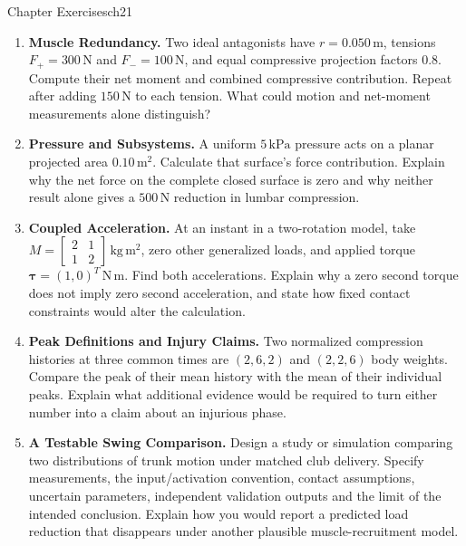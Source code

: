 \begin{exercises}{Chapter Exercises}{ch21}
\begin{enumerate}[leftmargin=*,itemsep=8pt,topsep=4pt]
\item \begin{minipage}[t]{\linewidth}
\textbf{Muscle Redundancy.} Two ideal antagonists have $r=0.050\,\mathrm m$, tensions $F_+=300\,\mathrm N$ and $F_-=100\,\mathrm N$, and equal compressive projection factors $0.8$. Compute their net moment and combined compressive contribution. Repeat after adding $150\,\mathrm N$ to each tension. What could motion and net-moment measurements alone distinguish?
\end{minipage}

\item \begin{minipage}[t]{\linewidth}
\textbf{Pressure and Subsystems.} A uniform $5\,\mathrm{kPa}$ pressure acts on a planar projected area $0.10\,\mathrm{m^2}$. Calculate that surface's force contribution. Explain why the net force on the complete closed surface is zero and why neither result alone gives a $500\,\mathrm N$ reduction in lumbar compression.
\end{minipage}

\item \begin{minipage}[t]{\linewidth}
\textbf{Coupled Acceleration.} At an instant in a two-rotation model, take $M=\left[\begin{smallmatrix}2&1\\1&2\end{smallmatrix}\right]\,\mathrm{kg\,m^2}$, zero other generalized loads, and applied torque $\bm\tau=(1,0)^T\,\mathrm{N\,m}$. Find both accelerations. Explain why a zero second torque does not imply zero second acceleration, and state how fixed contact constraints would alter the calculation.
\end{minipage}

\item \begin{minipage}[t]{\linewidth}
\textbf{Peak Definitions and Injury Claims.} Two normalized compression histories at three common times are $(2,6,2)$ and $(2,2,6)$ body weights. Compare the peak of their mean history with the mean of their individual peaks. Explain what additional evidence would be required to turn either number into a claim about an injurious phase.
\end{minipage}

\item \begin{minipage}[t]{\linewidth}
\textbf{A Testable Swing Comparison.} Design a study or simulation comparing two distributions of trunk motion under matched club delivery. Specify measurements, the input/activation convention, contact assumptions, uncertain parameters, independent validation outputs and the limit of the intended conclusion. Explain how you would report a predicted load reduction that disappears under another plausible muscle-recruitment model.
\end{minipage}

\end{enumerate}
\end{exercises}

